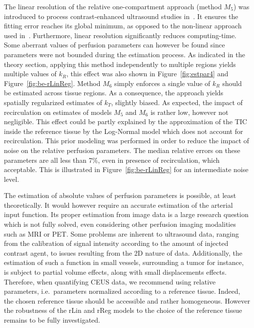 The linear resolution of the relative one-compartment approach (method $M_5$) was introduced to process contrast-enhanced ultrasound studies in~\cite{Doury:2016fi}. It ensures the fitting error reaches its global minimum, as opposed to the non-linear approach used in~\cite{Doury:2017fz}. Furthermore, linear resolution significantly reduces computing-time. Some aberrant values of perfusion parameters can however be found since parameters were not bounded during the estimation process. As indicated in the theory section, applying this method independently to multiple regions yields multiple values of $k_R$, this effect was also shown in Figure~\ref{fig:estpar4} and Figure~\ref{fig:be-rLinReg}. Method $M_6$ simply enforces a single value of $k_R$ should be estimated across tissue regions. As a consequence, the approach yields spatially regularized estimates of $k_T$, slightly biased. As expected, the impact of recirculation on estimates of models $M_5$ and $M_6$ is rather low, however not negligible. This effect could be partly explained by the approximation of the TIC inside the reference tissue by the Log-Normal model which does not account for recirculation. This prior modeling was performed in order to reduce the impact of noise on the relative perfusion parameters.
The median relative errors on these parameters are all less than 7\%, even in presence of recirculation, which acceptable. This is illustrated in Figure~\ref{fig:be-rLinReg} for an intermediate noise level. 

The estimation of absolute values of perfusion parameters is possible, at least theoretically. It would however require an accurate estimation of the arterial input function. Its proper estimation from image data is a large research question which is not fully solved, even considering other perfusion imaging modalities such as MRI or PET. Some problems are inherent to ultrasound data, ranging from the calibration of signal intensity according to the amount of injected contrast agent, to issues resulting from the 2D nature of data. Additionally, the estimation of such a function in small vessels, surrounding a tumor for instance, is subject to partial volume effects, along with small displacements effects. Therefore, when quantifying CEUS data, we recommend using relative parameters, i.e.~parameters normalized according to a reference tissue. Indeed, the chosen reference tissue should be accessible and rather homogeneous. However the robustness of the rLin and rReg models to the choice of the reference tissue remains to be fully investigated.
 
